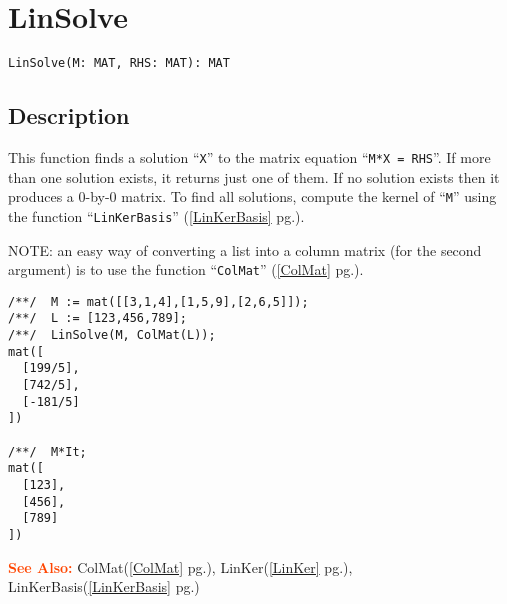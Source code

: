 \documentclass[a4paper]{mybook}
\newenvironment{command}{}{} %
\newcommand\SeeAlso{\par\textcolor{OrangeRed}{\textbf{\large See Also: }}}
\begin{document}
\section{LinSolve}
\label{LinSolve}
\begin{command} %


\begin{Verbatim}[label=syntax, rulecolor=\color{MidnightBlue},
frame=single]
LinSolve(M: MAT, RHS: MAT): MAT
\end{Verbatim}


\subsection*{Description}

This function finds a solution ``\verb&X&'' to the matrix equation ``\verb&M*X = RHS&''.
If more than one solution exists, it returns just one of them.
If no solution exists then it produces a 0-by-0 matrix.
To find all solutions, compute the kernel of ``\verb&M&'' using the function ``\verb&LinKerBasis&'' (\ref{LinKerBasis} pg.\pageref{LinKerBasis}).
\par 
NOTE: an easy way of converting a list into a column matrix (for the second
argument) is to use the function ``\verb&ColMat&'' (\ref{ColMat} pg.\pageref{ColMat}).
\begin{Verbatim}[label=example, rulecolor=\color{PineGreen}, frame=single]
/**/  M := mat([[3,1,4],[1,5,9],[2,6,5]]);
/**/  L := [123,456,789];
/**/  LinSolve(M, ColMat(L));
mat([
  [199/5],
  [742/5],
  [-181/5]
])

/**/  M*It;
mat([
  [123],
  [456],
  [789]
])
\end{Verbatim}


\SeeAlso %
  ColMat(\ref{ColMat} pg.\pageref{ColMat}), 
    LinKer(\ref{LinKer} pg.\pageref{LinKer}), 
    LinKerBasis(\ref{LinKerBasis} pg.\pageref{LinKerBasis})
\end{command} %
\end{document}
